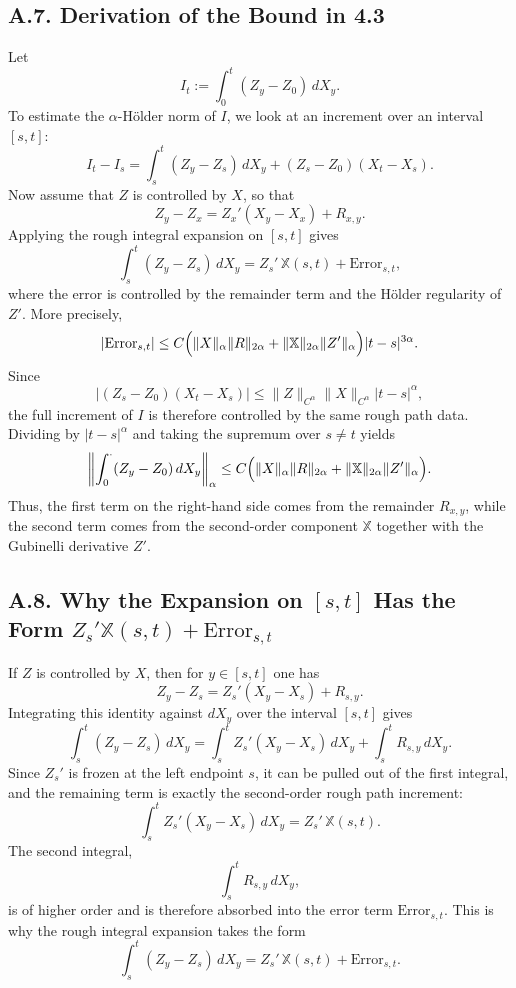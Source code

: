 \documentclass[11pt]{article}
\theoremstyle{definition}
\theoremstyle{remark}
\begin{document}
\subsection*{A.7. Derivation of the Bound in 4.3}
Let
\[
I_t:=\int_0^t (Z_y-Z_0)\,dX_y.
\]
To estimate the $\alpha$-H\"older norm of $I$, we look at an increment over an interval $[s,t]$:
\[
I_t-I_s
=
\int_s^t (Z_y-Z_s)\,dX_y
+
(Z_s-Z_0)(X_t-X_s).
\]
Now assume that $Z$ is controlled by $X$, so that
\[
Z_y-Z_x
=
Z_x'(X_y-X_x)+R_{x,y}.
\]
Applying the rough integral expansion on $[s,t]$ gives
\[
\int_s^t (Z_y-Z_s)\,dX_y
=
Z_s'\,\mathbb X(s,t)+\mathrm{Error}_{s,t},
\]
where the error is controlled by the remainder term and the H\"older regularity of $Z'$. More precisely,
\[
|\mathrm{Error}_{s,t}|
\le
C\Bigl(\|X\|_{\alpha}\|R\|_{2\alpha}
+
\|\mathbb X\|_{2\alpha}\|Z'\|_{\alpha}\Bigr)|t-s|^{3\alpha}.
\]
Since
\[
|(Z_s-Z_0)(X_t-X_s)|
\le
\|Z\|_{C^\alpha}\|X\|_{C^\alpha}|t-s|^\alpha,
\]
the full increment of $I$ is therefore controlled by the same rough path data. Dividing by $|t-s|^\alpha$ and taking the supremum over $s\neq t$ yields
\[
\left\|\int_0^\cdot (Z_y-Z_0)\,dX_y\right\|_{\alpha}
\le
C\Bigl(\|X\|_{\alpha}\|R\|_{2\alpha}
+
\|\mathbb X\|_{2\alpha}\|Z'\|_{\alpha}\Bigr).
\]
Thus, the first term on the right-hand side comes from the remainder $R_{x,y}$, while the second term comes from the second-order component $\mathbb X$ together with the Gubinelli derivative $Z'$.

\subsection*{A.8. Why the Expansion on $[s,t]$ Has the Form $Z_s'\mathbb X(s,t)+\mathrm{Error}_{s,t}$}
If $Z$ is controlled by $X$, then for $y\in[s,t]$ one has
\[
Z_y-Z_s
=
Z_s'(X_y-X_s)+R_{s,y}.
\]
Integrating this identity against $dX_y$ over the interval $[s,t]$ gives
\[
\int_s^t (Z_y-Z_s)\,dX_y
=
\int_s^t Z_s'(X_y-X_s)\,dX_y
+
\int_s^t R_{s,y}\,dX_y.
\]
Since $Z_s'$ is frozen at the left endpoint $s$, it can be pulled out of the first integral, and the remaining term is exactly the second-order rough path increment:
\[
\int_s^t Z_s'(X_y-X_s)\,dX_y
=
Z_s'\,\mathbb X(s,t).
\]
The second integral,
\[
\int_s^t R_{s,y}\,dX_y,
\]
is of higher order and is therefore absorbed into the error term $\mathrm{Error}_{s,t}$. This is why the rough integral expansion takes the form
\[
\int_s^t (Z_y-Z_s)\,dX_y
=
Z_s'\,\mathbb X(s,t)+\mathrm{Error}_{s,t}.
\]
\end{document}
